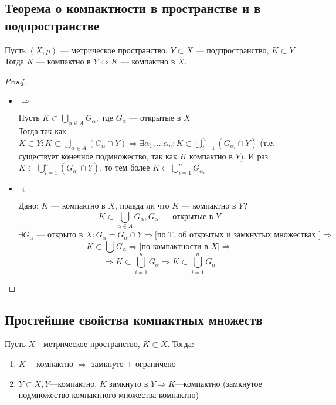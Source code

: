  \newpage
{}
\subsection{Теорема о компактности в пространстве и в подпространстве}
 Пусть $(X,\rho)$ --- метрическое пространство, $Y\subset X$ --- подпространство, $K\subset Y$ \\
	    Тогда $K$ --- компактно в $Y \Leftrightarrow K$ --- компактно в $X$.
	
	\begin{proof} \nobreakspace
	\begin{itemize}
	    \item $\Rightarrow$
		
		Пусть $K \subset \bigcup\limits_{\alpha \in A} G_\alpha, $ где $G_\alpha$ --- открытые в $X$ \\
		Тогда так как $K \subset Y: K \subset \bigcup\limits_{\alpha \in A} \left(G_\alpha \cap Y\right) \Rightarrow \exists \alpha_1, \ldots \alpha_n: K \subset \bigcup\limits_{i=1}^{n}(G_{\alpha_i} \cap Y)$ (т.е. существует конечное подмножество, так как $K$ компактно в $Y$). И раз $K \subset \bigcup\limits_{i=1}^{n}(G_{\alpha_i} \cap Y)$, то тем более $K \subset \bigcup\limits_{i=1}^{n}G_{\alpha_i}$
		\item $\Leftarrow$
	
	    Дано: $K$ --- компактно в $X$, правда ли что $K$ --- компактно в $Y$?
	    $$K\subset\bigcup\limits_{\alpha\in A} G_\alpha, G_\alpha\text{ --- открытые в }Y$$
	    $$\exists \tilde G_\alpha \textit{ --- открыто в $X$} : G_\alpha=\tilde G_\alpha\cap Y \Rightarrow \text{[по Т. об открытых и замкнутых множествах  ]} \Rightarrow$$ $$ K \subset \bigcup \tilde G_\alpha \Rightarrow \text{[по компактности в $X$]} \Rightarrow $$
	    $$\Rightarrow K \subset \bigcup\limits_{i = 1}^{n} \tilde G_\alpha \Rightarrow  K \subset \bigcup\limits_{i = 1}^{n}  G_\alpha$$
	   \end{itemize}
	\end{proof}
	\subsection{Простейшие свойства компактных множеств}
Пусть $X$---метрическое пространство, $K \subset X$. Тогда:
		\begin{enumerate}
			\item $K$--- компактно $\Rightarrow$ замкнуто + ограничено
			\item $Y \subset X, Y$---компактно, $K$ замкнуто в $Y \Rightarrow K$---компактно (замкнутое подмножество компактного множества компактно)
		\end{enumerate}
	
